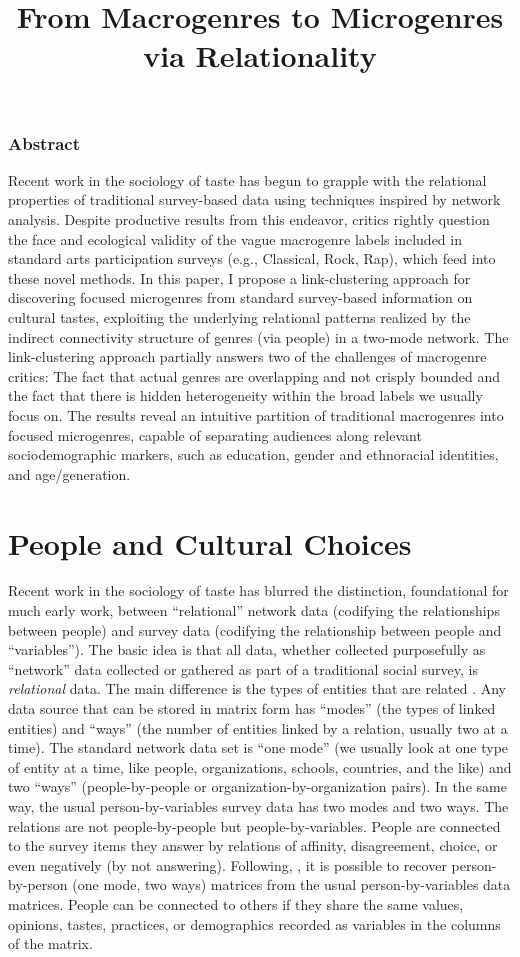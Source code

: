 \documentclass[a4paper,12pt]{extarticle}
\title{From Macrogenres to Microgenres via Relationality}
\begin{document}
\maketitle
\subsubsection*{Abstract} 
Recent work in the sociology of taste has begun to grapple with the relational properties of traditional survey-based data using techniques inspired by network analysis. Despite productive results from this endeavor, critics rightly question the face and ecological validity of the vague macrogenre labels included in standard arts participation surveys (e.g., Classical, Rock, Rap), which feed into these novel methods. In this paper, I propose a link-clustering approach for discovering focused microgenres from standard survey-based information on cultural tastes, exploiting the underlying relational patterns realized by the indirect connectivity structure of genres (via people) in a two-mode network. The link-clustering approach partially answers two of the challenges of macrogenre critics: The fact that actual genres are overlapping and not crisply bounded and the fact that there is hidden heterogeneity within the broad labels we usually focus on. The results reveal an intuitive partition of traditional macrogenres into focused microgenres, capable of separating audiences along relevant sociodemographic markers, such as education, gender and ethnoracial identities, and age/generation. 
\newpage

\section{People and Cultural Choices}
Recent work in the sociology of taste has blurred the distinction, foundational for much early work, between ``relational'' network data (codifying the relationships between people) and survey data (codifying the relationship between people and ``variables''). The basic idea is that all data, whether collected purposefully as ``network'' data collected or gathered as part of a traditional social survey, is \textit{relational} data. The main difference is the types of entities that are related \citep{borgatti_everett97}. Any data source that can be stored in matrix form has ``modes'' (the types of linked entities) and ``ways'' (the number of entities linked by a relation, usually two at a time). The standard network data set is ``one mode'' (we usually look at one type of entity at a time, like people, organizations, schools, countries, and the like) and two ``ways'' (people-by-people or organization-by-organization pairs). In the same way, the usual person-by-variables survey data has two modes and two ways. The relations are not people-by-people but people-by-variables. People are connected to the survey items they answer by relations of affinity, disagreement, choice, or even negatively (by not answering). Following, \citet{breiger74}, it is possible to recover person-by-person (one mode, two ways) matrices from the usual person-by-variables data matrices. People can be connected to others if they share the same values, opinions, tastes, practices, or demographics recorded as variables in the columns of the matrix. 
\end{document}
